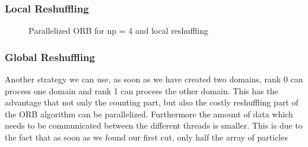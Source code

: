 \documentclass[]{article}
\begin{document}
\subsubsection{Local Reshuffling}

\begin{figure}[H]
	\begin{center}
	\end{center}
\caption{Parallelized ORB for np = 4 and local reshuffling}
\label{fig:orb_parallel}
\end{figure}

\subsubsection{Global Reshuffling}

Another strategy we can use, as soon as we have created two domains, rank 0 can process one domain and rank 1 can process the other domain. This has the advantage that not only the counting part, but also the costly reshuffling part of the ORB algorithm can be parallelized. Furthermore the amount of data which needs to be communicated between the different threads is smaller. This is due to the fact that as soon as we found our first cut, only half the array of particles 
\end{document}
